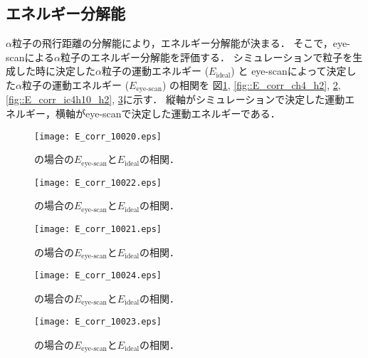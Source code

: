 \documentclass[../master]{subfiles}
\begin{document}
\subsection{エネルギー分解能}
$\alpha$粒子の飛行距離の分解能により，エネルギー分解能が決まる．
そこで，eye-scanによる$\alpha$粒子のエネルギー分解能を評価する．
シミュレーションで粒子を生成した時に決定した$\alpha$粒子の運動エネルギー ($E_{\text{ideal}}$) と
eye-scanによって決定した$\alpha$粒子の運動エネルギー ($E_{\text{eye-scan}}$) の相関を
図\ref{fig::E_corr_ch4}, \ref{fig::E_corr_ch4_h2}, \ref{fig::E_corr_ch4_he},
\ref{fig::E_corr_ic4h10_h2}, \ref{fig::E_corr_ic4h10_he}に示す．
縦軸がシミュレーションで決定した運動エネルギー，横軸がeye-scanで決定した運動エネルギーである．
\begin{figure}
  \centering
  \begin{minipage}{0.45\columnwidth}
    \centering
    \texttt{[image: E\_corr\_10020.eps]}
    \caption{\Methane の場合の$E_{\text{eye-scan}}$と$E_{\text{ideal}}$の相関．}
    \label{fig::E_corr_ch4}
  \end{minipage}  
\end{figure}
\begin{figure}
  \centering
  \begin{minipage}{0.45\columnwidth}
    \centering
    \texttt{[image: E\_corr\_10022.eps]}
    \caption{\MethaneHydro の場合の$E_{\text{eye-scan}}$と$E_{\text{ideal}}$の相関．}
    \label{fig::E_corr_ch4_h2}
  \end{minipage}
  \begin{minipage}{0.45\columnwidth}
    \centering
    \texttt{[image: E\_corr\_10021.eps]}
    \caption{\MethaneHerium の場合の$E_{\text{eye-scan}}$と$E_{\text{ideal}}$の相関．}
    \label{fig::E_corr_ch4_he}
  \end{minipage}
\end{figure}
\begin{figure}
  \centering
  \begin{minipage}{0.45\columnwidth}
    \centering
    \texttt{[image: E\_corr\_10024.eps]}
    \caption{\isoButaneHydro の場合の$E_{\text{eye-scan}}$と$E_{\text{ideal}}$の相関．}
    \label{fig::E_corr_ic4h10_h2}
  \end{minipage}
  \begin{minipage}{0.45\columnwidth}
    \centering
    \texttt{[image: E\_corr\_10023.eps]}
    \caption{\isoButaneHerium の場合の$E_{\text{eye-scan}}$と$E_{\text{ideal}}$の相関．}
    \label{fig::E_corr_ic4h10_he}
  \end{minipage}
\end{figure}
\end{document}
